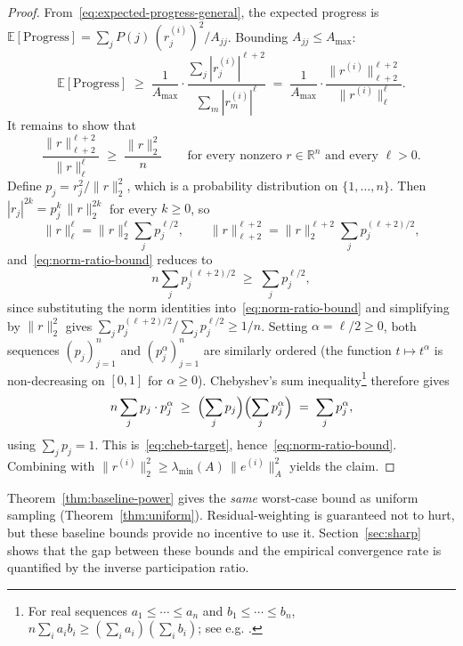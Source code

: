 \documentclass[pdflatex,sn-mathphys-num]{sn-jnl}%
\newcommand{\R}{\mathbb{R}}
\newcommand{\E}{\mathbb{E}}
\newcommand{\Anorm}[1]{\|#1\|_{A}}
\newcommand{\lmin}{\lambda_{\min}}
\theoremstyle{thmstyleone}%
\theoremstyle{thmstyletwo}%
\theoremstyle{thmstylethree}%
\begin{document}
\begin{proof}
From~\eqref{eq:expected-progress-general}, the expected progress is
$\E[\mathrm{Progress}] = \sum_j P(j)\,(r_j^{(i)})^2/A_{jj}$.
Bounding $A_{jj} \leq A_{\max}$:
$$
\E[\mathrm{Progress}] \;\geq\;
\frac{1}{A_{\max}}\cdot\frac{\sum_j |r_j^{(i)}|^{\ell+2}}{\sum_m |r_m^{(i)}|^\ell}
\;=\;
\frac{1}{A_{\max}}\cdot\frac{\|r^{(i)}\|_{\ell+2}^{\ell+2}}{\|r^{(i)}\|_\ell^\ell}.
$$
It remains to show that
\begin{equation}
\label{eq:norm-ratio-bound}
\frac{\|r\|_{\ell+2}^{\ell+2}}{\|r\|_\ell^\ell} \;\geq\; \frac{\|r\|_2^2}{n}
\qquad \text{for every nonzero } r \in \R^n \text{ and every } \ell > 0.
\end{equation}
Define $p_j = r_j^2/\|r\|_2^2$, which is a probability distribution on $\{1,\ldots,n\}$.
Then $|r_j|^{2k} = p_j^k\,\|r\|_2^{2k}$ for every $k \geq 0$, so
\[
\|r\|_\ell^\ell = \|r\|_2^\ell \sum_j p_j^{\ell/2},
\qquad
\|r\|_{\ell+2}^{\ell+2} = \|r\|_2^{\ell+2} \sum_j p_j^{(\ell+2)/2},
\]
and~\eqref{eq:norm-ratio-bound} reduces to
\begin{equation}
\label{eq:cheb-target}
n \sum_j p_j^{(\ell+2)/2} \;\geq\; \sum_j p_j^{\ell/2},
\end{equation}
since substituting the norm identities into~\eqref{eq:norm-ratio-bound}
and simplifying by $\|r\|_2^2$ gives
$\sum_j p_j^{(\ell+2)/2} / \sum_j p_j^{\ell/2} \geq 1/n$.
Setting $\alpha = \ell/2 \geq 0$, both sequences $(p_j)_{j=1}^n$ and $(p_j^\alpha)_{j=1}^n$ are
similarly ordered (the function $t \mapsto t^\alpha$ is non-decreasing on $[0,1]$ for $\alpha \geq 0$).
Chebyshev's sum inequality\footnote{For real sequences
$a_1 \leq \cdots \leq a_n$ and $b_1 \leq \cdots \leq b_n$,
$n\sum_i a_i b_i \geq (\sum_i a_i)(\sum_i b_i)$; see e.g.
\cite[Theorem 43]{hardy1952inequalities}.} therefore gives
\[
n \sum_j p_j \cdot p_j^\alpha
\;\geq\;
\Bigl(\sum_j p_j\Bigr)\Bigl(\sum_j p_j^\alpha\Bigr)
\;=\; \sum_j p_j^\alpha,
\]
using $\sum_j p_j = 1$. This is~\eqref{eq:cheb-target}, hence~\eqref{eq:norm-ratio-bound}.
Combining with $\|r^{(i)}\|_2^2 \geq \lmin(A)\,\Anorm{e^{(i)}}^2$ yields the claim.
\end{proof}

Theorem~\ref{thm:baseline-power} gives the \emph{same} worst-case bound as uniform sampling (Theorem~\ref{thm:uniform}). Residual-weighting is guaranteed not to hurt, but these baseline bounds provide no incentive to use it. Section~\ref{sec:sharp} shows that the gap between these bounds and the empirical convergence rate is quantified by the inverse participation ratio.
\end{document}
